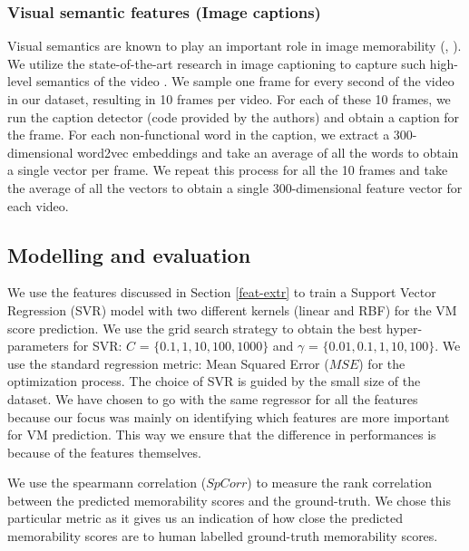 \documentclass[sigconf]{acmart}
\begin{document}
\subsubsection{Visual semantic features (Image captions)}
\label{sem-feat}
Visual semantics are known to play an important role in image memorability (\cite{sem-mem}, \cite{squalli_2017_deep}).
We utilize the state-of-the-art research in image captioning to capture such high-level semantics of the video \cite{caption-feat}.
We sample one frame for every second of the video in our dataset, resulting in 10 frames per video.
For each of these 10 frames, we run the caption detector (code provided by the authors) and obtain a caption for the frame.
For each non-functional word in the caption, we extract a 300-dimensional word2vec \cite{word2vec} embeddings and take an average of all the words to obtain a single vector per frame.
We repeat this process for all the 10 frames and take the average of all the vectors to obtain a single 300-dimensional feature vector for each video.

\subsection{Modelling and evaluation}
\label{model-eval}
We use the features discussed in Section \ref{feat-extr} to train a Support Vector Regression (SVR) model with two different kernels (linear and RBF) for the VM score prediction. 
We use the grid search strategy to obtain the best hyper-parameters for SVR: $C$ = $\{0.1, 1, 10, 100, 1000\}$ and $\gamma$ = $\{0.01, 0.1, 1, 10, 100\}$.
We use the standard regression metric: Mean Squared Error ($MSE$) for the optimization process.
The choice of SVR is guided by the small size of the dataset. 
We have chosen to go with the same regressor for all the features because our focus was mainly on identifying which features are more important for VM prediction. 
This way we ensure that the difference in performances is because of the features themselves.

We use the spearmann correlation ($SpCorr$) to measure the rank correlation between the predicted memorability scores and the ground-truth.
We chose this particular metric as it gives us an indication of how close the predicted memorability scores are to human labelled ground-truth memorability scores.
\end{document}
